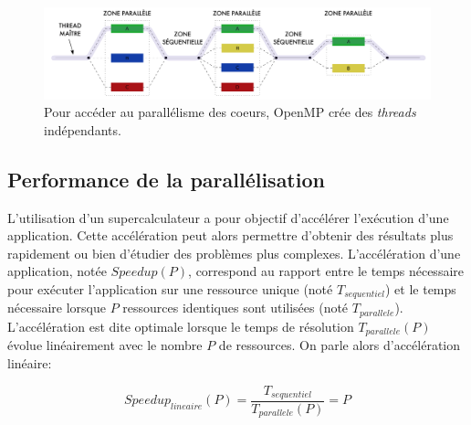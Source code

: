                 \begin{figure}
                \center
                \includegraphics[width=14cm]{images/openmp.png}
                \caption{\label{fig:openmp} Pour accéder au parallélisme des coeurs, OpenMP crée des \textit{threads} indépendants\protect\footnotemark.}
                \end{figure}
                

\subsection{Performance de la parallélisation}
\label{sec:parallele_perf}
    
        L'utilisation d'un supercalculateur a pour objectif d'accélérer l'exécution d'une application. Cette accélération peut alors permettre d'obtenir des résultats plus rapidement ou bien d'étudier des problèmes plus complexes. L'accélération d'une application, notée $Speedup(P)$, correspond au rapport entre le temps nécessaire pour exécuter l'application sur une ressource unique (noté $T_{sequentiel}$) et le temps nécessaire lorsque $P$ ressources identiques sont utilisées (noté $T_{parallele}$). L'accélération est dite optimale lorsque le temps de résolution $T_{parallele}(P)$ évolue linéairement avec le nombre $P$ de ressources. On parle alors d'accélération linéaire:
        
        \begin{equation}
        \label{eq_speedup}
        Speedup_{lineaire} (P) = \frac{T_{sequentiel}}{T_{parallele}(P)} = P
        \end{equation}
        
